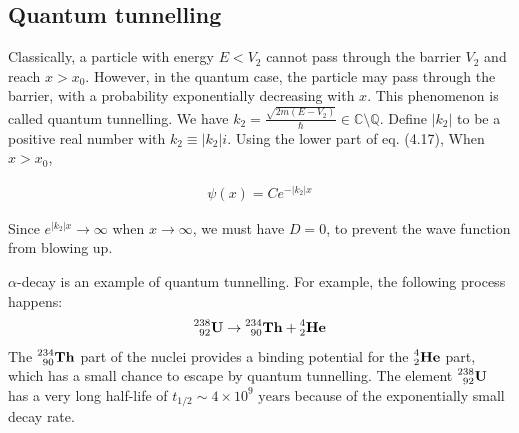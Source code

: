 \documentclass[12pt]{book} %
\numberwithin{equation}{chapter}
\def\Q{\mathbb{Q}}
\def\C{\mathbb{C}}
\def\a{\alpha}
\begin{document}
\subsection*{Quantum tunnelling}
Classically, a particle with energy $E<V_{2}$ cannot pass through the barrier $V_{2}$ and reach $x>x_{0}$. However, in the quantum case, the particle may pass through the barrier, with a probability exponentially decreasing with $x$. This phenomenon is called quantum tunnelling.\bigskip\newline
We have $k_{2}=\frac{\sqrt{2m(E-V_{2})}}{\hbar}\in\C\setminus\Q$. Define $|k_{2}|$ to be a positive real number with $k_{2}\equiv|k_{2}|i$. Using the lower part of eq. (4.17), When $x>x_{0}$,
\begin{eqnbox}\begin{align}
\psi(x)=Ce^{-\left|k_{2}\right|x}
\end{align}\end{eqnbox}
Since $e^{\left|k_{2}\right|x}\to\infty$ when $x\to\infty$, we must have $D=0$, to prevent the wave function from blowing up.
\begin{example}[$\a$-decay]
$\a$-decay is an example of quantum tunnelling. For example, the following process happens:
\begin{align*}
\prescript{238}{92}{\mathbf{U}}\to \prescript{234}{90}{\mathbf{Th}}+\prescript{4}{2}{\mathbf{He}}
\end{align*}
The $\prescript{234}{90}{\mathbf{Th}}$ part of the nuclei provides a binding potential for the $\prescript{4}{2}{\mathbf{He}}$ part, which has a small chance to escape by quantum tunnelling. The element $\prescript{238}{92}{\mathbf{U}}$ has a very long half-life of $t_{1/2}\sim4\times10^{9}\text{ years}$ because of the exponentially small decay rate.
\end{example}
\pagebreak
\end{document}
